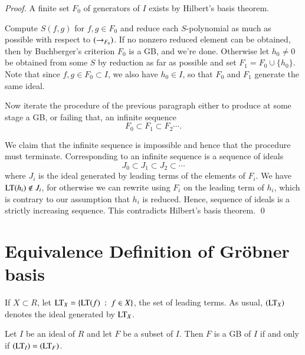 \documentclass{llncs}
\def\op#1{{\hbox{#1}}}
\begin{document}
\begin{proof}  A finite set $F_0$
of generators of $I$ exists
by Hilbert's basis theorem.  

Compute $S(f,g)$ for $f,g\in F_0$ and reduce each $S$-polynomial as much as possible with respect to $(\rightarrow_{F_0})$.  If no nonzero reduced element can be obtained, then by Buchberger's criterion $F_0$ is a GB, and we're done.  Otherwise let $h_0\ne 0$ be obtained from some $S$ by reduction as far as possible and
set $F_1 = F_0\cup \{h_0\}$.  Note that since $f,g\in F_0\subset I$, we also have $h_0\in I$, so that $F_0$ and $F_1$ generate the same ideal.

Now iterate the procedure of the previous paragraph either to produce at some stage a GB, or failing that, an infinite sequence
\[
F_0 \subset F_1 \subset F_2 \cdots.
\]

We claim that the infinite sequence is impossible and hence that the procedure must terminate.  
Corresponding to an infinite sequence is a sequence of ideals
\[
J_0 \subset J_1 \subset J_2 \subset \cdots
\]
where $J_i$ is the ideal generated by leading terms of the elements of $F_i$.
We have $\op{LT}(h_i) \not\in J_i$, for otherwise we can rewrite using $F_i$ on the leading term of $h_i$, which is contrary to our assumption that $h_i$ is reduced.  Hence, sequence of ideals is a strictly increasing sequence.  This contradicts Hilbert's basis theorem.
\qed
\end{proof}

\section{Equivalence Definition of Gr\"obner basis}

If $X\subset R$, let $\LT_X = \{\op{LT}(f) \mid f\in X\}$, the set of leading terms.
As usual, $(\LT_X)$ denotes the ideal generated by $\LT_X$.

\begin{lemma} Let $I$ be an ideal of $R$ and let $F$ be a subset of $I$.
Then $F$ is a GB of $I$ if and only if $(\LT_I) = (\LT_F)$.
\end{lemma}
\end{document}
